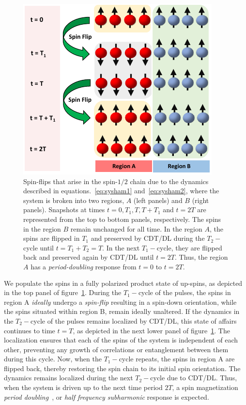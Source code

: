 \documentclass[12pt]{iopart}
\begin{document}
\begin{figure}[t!]
    \centering
    \includegraphics[width=7.cm]{figure2.pdf}
    \caption{Spin-flips that arise in the spin-$1/2$ chain due to the dynamics described in equations.~\ref{eq:sysham1} and~\ref{eq:sysham2}, where the system is broken into two regions, $A$ (left panels) and $B$ (right panels). Snapshots at times $t=0, T_1, T, T+T_1 $ and $t=2T$ are represented from the top to bottom panels, respectively. The spins in the region $B$ remain unchanged for all time. In the region $A$, the spins are flipped in $T_1$ and preserved by CDT/DL during the $T_2-$cycle until $t=T_1+T_2=T$. In the next $T_1-$cycle, they are flipped back and preserved again by CDT/DL until $t=2T$. Thus, the region $A$ has a \textit{period-doubling} response from $t=0$ to $t=2T$.}
    \label{Fig:spinflip}
\end{figure}
	
	We populate the spins in a fully polarized product state of up-spins, as depicted in the top panel of figure~\ref{Fig:spinflip}. During the $T_1-$cycle of the pulses,  the spins in region A \textit{ideally} undergo a \textit{spin-flip} resulting in a spin-down orientation, while the spins situated within region B, remain ideally unaltered. If the dynamics in the $T_2-$cycle of the pulses remains localized by CDT/DL, this state of affairs continues to time $t=T$, as depicted in the next lower panel of figure~\ref{Fig:spinflip}. The localization ensures that each of the spins of the system is independent of each other, preventing any growth of correlations or entanglement between them during this cycle. Now, when the $T_1-$cycle repeats, the spins in region A are flipped back, thereby restoring the spin chain to its initial spin orientation. The dynamics remains localized during the next $T_2-$cycle due to CDT/DL. Thus, when the system is driven up to the next time period $2T$, a spin magnetization \textit{period doubling}~\cite{rovny_31mathrmp_2018, Pan2020}, or \textit{half frequency subharmonic} response is expected. 
	
\end{document}
